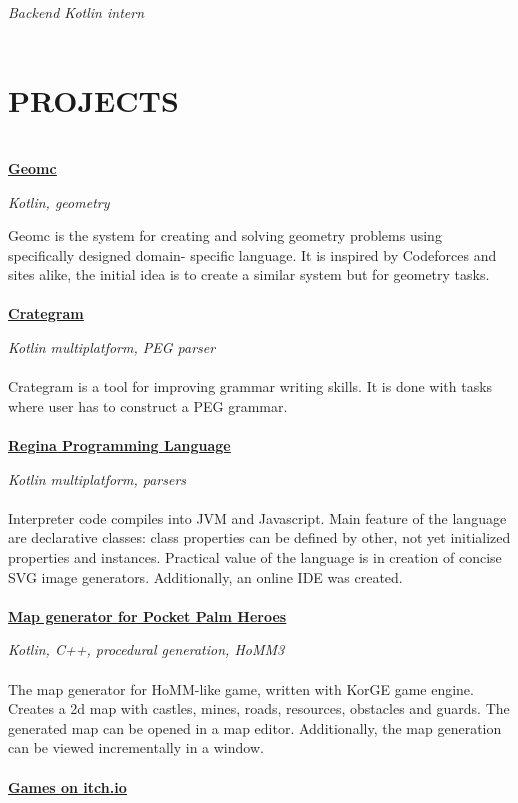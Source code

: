 \documentclass{article}
\begin{document}
\noindent \textit{Backend Kotlin intern}
\\\\
\section*{PROJECTS}
\makebox[530pt]{\rule{570pt}{0.4pt}}\\
\noindent\href{https://45.156.25.18/}{{\textbf{\underline{Geomc}}}}

\noindent\textit{Kotlin, geometry}

\noindent Geomc is the system for creating and solving geometry problems using specifically designed domain-
specific language. It is inspired by Codeforces and sites alike, the initial idea is to create a similar system
but for geometry tasks.
\\\\
\noindent\href{https://llesha.github.io/CrateGram/}{{\textbf{\underline{Crategram}}}}

\noindent\textit{Kotlin multiplatform, PEG parser}
\\\\
\noindent Crategram is a tool for improving grammar writing skills. It is done with tasks where user has to construct
a PEG grammar.
\\\\
\noindent\href{https://llesha.github.io/regina/ide/}{{\textbf{\underline{Regina Programming Language}}}}

\noindent\textit{Kotlin multiplatform, parsers}
\\\\
\noindent Interpreter code compiles into JVM and Javascript. Main feature of the language are declarative classes: class properties can be defined by other, not yet initialized properties and instances. Practical value of the language is in creation of concise SVG image generators. Additionally, an online IDE was created.
\\\\
\noindent\href{https://github.com/llesha/MapGen-KorGE}{{\textbf{\underline{Map generator for Pocket Palm Heroes}}}}

\noindent\textit{Kotlin, C++, procedural generation, HoMM3}
 \\\\
\noindent The map generator for HoMM-like game, written with KorGE game engine. Creates a 2d map with castles, mines, roads, resources, obstacles and guards. The generated map can be opened in a map editor. Additionally, the map generation can be viewed incrementally in a window.
\\\\
\noindent\href{https://llesha.itch.io/}{{\textbf{\underline{Games on itch.io}}}}
\end{document}

